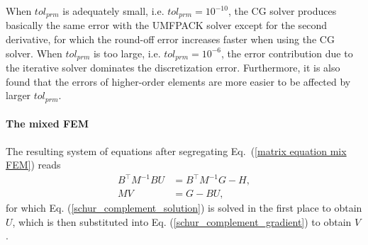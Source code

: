 \documentclass[review,3p]{elsarticle}
\begin{document}
When $tol_{prm}$ is adequately small, i.e. $tol_{prm}=10^{-10}$, the CG solver produces basically the same error with the UMFPACK solver except for the second derivative, for which the round-off error increases faster when using the CG solver.
When $tol_{prm}$ is too large, i.e. $tol_{prm}=10^{-6}$, the error contribution due to the iterative solver dominates the discretization error. Furthermore, it is also found that the errors of higher-order elements are more easier to be affected by larger $tol_{prm}$.


\paragraph{The mixed FEM}


The resulting system of equations after segregating Eq.~(\ref{matrix equation mix FEM}) reads
\begin{subequations}
 \begin{align}
  B^{\top} M^{-1} B U &= B^{\top} M^{-1} G - H, 	\label{schur_complement_solution} \\
  MV&=G-BU,						\label{schur_complement_gradient}
\end{align}						\label{schur_complement_solu_grad}%
\end{subequations}
for which Eq. (\ref{schur_complement_solution}) is solved in the first place to obtain $U$, which is then substituted into Eq. (\ref{schur_complement_gradient}) to obtain $V$.
\end{document}
